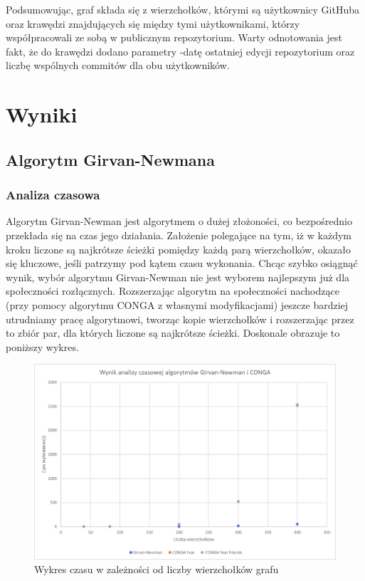\documentclass{article}
\begin{document}
Podsumowując, graf składa się z wierzchołków, którymi są użytkownicy GitHuba oraz krawędzi znajdujących się między tymi użytkownikami, którzy współpracowali ze sobą w publicznym repozytorium. Warty odnotowania jest fakt, że do krawędzi dodano parametry -datę ostatniej edycji repozytorium oraz liczbę wspólnych commitów dla obu użytkowników.
\section{Wyniki}

\subsection{Algorytm Girvan-Newmana}
\subsubsection{Analiza czasowa}
Algorytm Girvan-Newman jest algorytmem o dużej złożoności, co bezpośrednio przekłada się na czas jego działania. Założenie polegające na tym, iż w każdym kroku liczone są najkrótsze ścieżki pomiędzy każdą parą wierzchołków, okazało się kluczowe, jeśli patrzymy pod kątem czasu wykonania. Chcąc szybko osiągnąć wynik, wybór algorytmu Girvan-Newman nie jest wyborem najlepszym już dla społeczności rozłącznych. Rozszerzając algorytm na społeczności nachodzące (przy pomocy algorytmu CONGA z własnymi modyfikacjami) jeszcze bardziej utrudniamy pracę algorytmowi, tworząc kopie wierzchołków i rozszerzając przez to zbiór par, dla których liczone są najkrótsze ścieżki. Doskonale obrazuje to poniższy wykres.

\begin{figure}[H]
\centering
\includegraphics[width=\textwidth]{images/is-sample-8.png}
\caption{Wykres czasu w zależności od liczby wierzchołków grafu}
\end{figure}
\end{document}
